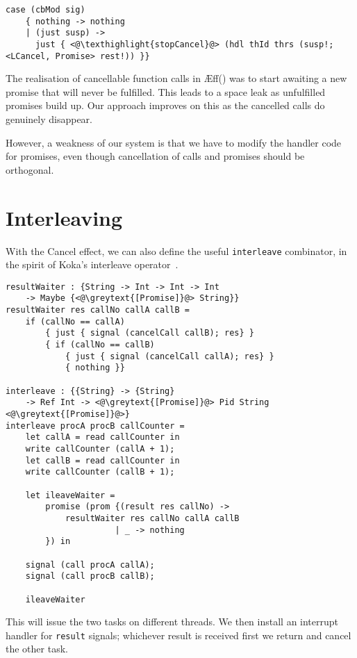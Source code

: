 \documentclass[msc,deptreport,cs]{infthesis} %
\newcommand{\code}[1]{\lstinline{#1}}
\newcommand{\texthighlight}[1]{%
  \colorbox{red!20}{#1}}
\newcommand{\greytext}[1]{\textcolor{black!40}{#1}}
\newcommand\aeff{{\AE}ff\xspace}
\newcommand{\todo}[1]
           {{\par\noindent\small\color{RoyalPurple}
  \framebox{\parbox{\dimexpr\linewidth-2\fboxsep-2\fboxrule}
    {\textbf{TODO:} #1}}}}
\begin{document}
\begin{lstlisting}
case (cbMod sig)
    { nothing -> nothing
    | (just susp) ->
      just { <@\texthighlight{stopCancel}@> (hdl thId thrs (susp!; <LCancel, Promise> rest!)) }}
\end{lstlisting}

The realisation of cancellable function calls in
\aeff(\cite{ahman2020asynchronous}) was to start awaiting a new promise that
will never be fulfilled. This leads to a space leak as unfulfilled promises
build up. Our approach improves on this as the cancelled calls do genuinely
disappear.

However, a weakness of our system is that we have to modify the handler code for
promises, even though cancellation of calls and promises should be orthogonal.

\section{Interleaving}

With the \textsf{Cancel} effect, we can also define the useful \code{interleave}
combinator, in the spirit of Koka's interleave
operator~\cite{leijen2017structured}.


\begin{lstlisting}
resultWaiter : {String -> Int -> Int -> Int
    -> Maybe {<@\greytext{[Promise]}@> String}}
resultWaiter res callNo callA callB =
    if (callNo == callA)
        { just { signal (cancelCall callB); res} }
        { if (callNo == callB)
            { just { signal (cancelCall callA); res} }
            { nothing }}

interleave : {{String} -> {String}
    -> Ref Int -> <@\greytext{[Promise]}@> Pid String <@\greytext{[Promise]}@>}
interleave procA procB callCounter =
    let callA = read callCounter in
    write callCounter (callA + 1);
    let callB = read callCounter in
    write callCounter (callB + 1);

    let ileaveWaiter =
        promise (prom {(result res callNo) ->
            resultWaiter res callNo callA callB
                      | _ -> nothing
        }) in

    signal (call procA callA);
    signal (call procB callB);

    ileaveWaiter
\end{lstlisting}

This will issue the two tasks on different threads. We then install an interrupt
handler for \code{result} signals; whichever result is received first we return
and cancel the other task.
\end{document}
